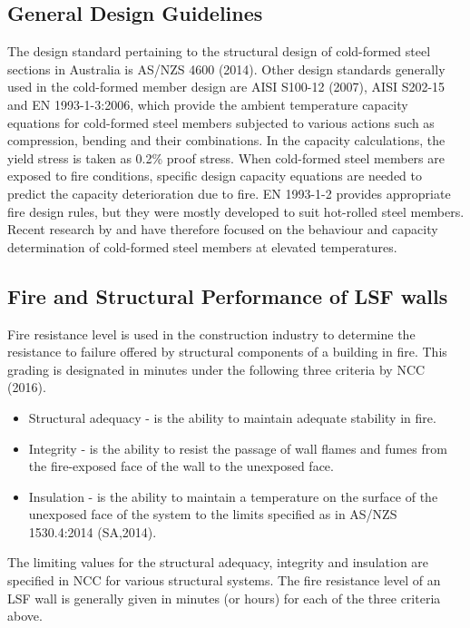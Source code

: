 \subsection{General Design Guidelines}

The design standard pertaining to the structural design of cold-formed steel sections in Australia is AS/NZS 4600 (2014). Other design standards generally used in the cold-formed member design are AISI S100-12 (2007), AISI S202-15 and EN 1993-1-3:2006, which  provide the ambient temperature capacity equations for cold-formed steel members subjected to various actions such as compression, bending and their combinations.  In the capacity calculations, the yield stress is taken as 0.2\% proof stress. When cold-formed steel members are exposed to fire conditions, specific design capacity equations are needed to predict the capacity deterioration due to fire. EN 1993-1-2 provides appropriate fire design rules, but they were mostly developed to suit hot-rolled steel members. Recent research by \citet{Ranawaka2009a} and \citet{Kankanamge2011} have therefore focused on the behaviour and capacity determination of cold-formed steel members at elevated temperatures.

\subsection{Fire and Structural Performance of LSF walls}

Fire resistance level is used in the construction industry to determine the resistance to failure offered by structural components of a building in fire. This grading is designated in minutes under the following three criteria by NCC (2016).

\begin{itemize}
\item Structural adequacy - is the ability to maintain adequate stability in fire.
\item Integrity - is the ability to resist the passage of wall flames and fumes from the fire-exposed face of the wall to the unexposed face. 
\item Insulation - is the ability to maintain a temperature on the surface of the unexposed face of the system to the limits specified as in AS/NZS 1530.4:2014 (SA,2014).
\end{itemize}

The limiting values for the structural adequacy, integrity and insulation are specified in  NCC for various structural systems. The fire resistance level of an LSF wall is generally given in minutes (or hours) for each of the three criteria above.

